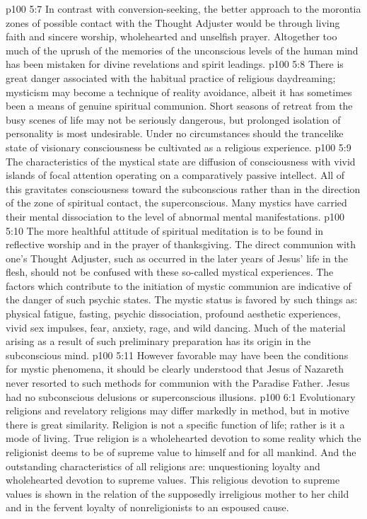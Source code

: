 \pc \vs p100 5:7 In contrast with conversion\hyp{}seeking, the better approach to the morontia zones of possible contact with the Thought Adjuster would be through living faith and sincere worship, wholehearted and unselfish prayer. Altogether too much of the uprush of the memories of the unconscious levels of the human mind has been mistaken for divine revelations and spirit leadings.
\vs p100 5:8 There is great danger associated with the habitual practice of religious daydreaming; mysticism may become a technique of reality avoidance, albeit it has sometimes been a means of genuine spiritual communion. Short seasons of retreat from the busy scenes of life may not be seriously dangerous, but prolonged isolation of personality is most undesirable. Under no circumstances should the trancelike state of visionary consciousness be cultivated as a religious experience.
\vs p100 5:9 The characteristics of the mystical state are diffusion of consciousness with vivid islands of focal attention operating on a comparatively passive intellect. All of this gravitates consciousness toward the subconscious rather than in the direction of the zone of spiritual contact, the superconscious. Many mystics have carried their mental dissociation to the level of abnormal mental manifestations.
\vs p100 5:10 The more healthful attitude of spiritual meditation is to be found in reflective worship and in the prayer of thanksgiving. The direct communion with one’s Thought Adjuster, such as occurred in the later years of Jesus’ life in the flesh, should not be confused with these so\hyp{}called mystical experiences. The factors which contribute to the initiation of mystic communion are indicative of the danger of such psychic states. The mystic status is favored by such things as: physical fatigue, fasting, psychic dissociation, profound aesthetic experiences, vivid sex impulses, fear, anxiety, rage, and wild dancing. Much of the material arising as a result of such preliminary preparation has its origin in the subconscious mind.
\vs p100 5:11 However favorable may have been the conditions for mystic phenomena, it should be clearly understood that Jesus of Nazareth never resorted to such methods for communion with the Paradise Father. Jesus had no subconscious delusions or superconscious illusions.
\vs p100 6:1 Evolutionary religions and revelatory religions may differ markedly in method, but in motive there is great similarity. Religion is not a specific function of life; rather is it a mode of living. True religion is a wholehearted devotion to some reality which the religionist deems to be of supreme value to himself and for all mankind. And the outstanding characteristics of all religions are: unquestioning loyalty and wholehearted devotion to supreme values. This religious devotion to supreme values is shown in the relation of the supposedly irreligious mother to her child and in the fervent loyalty of nonreligionists to an espoused cause.
